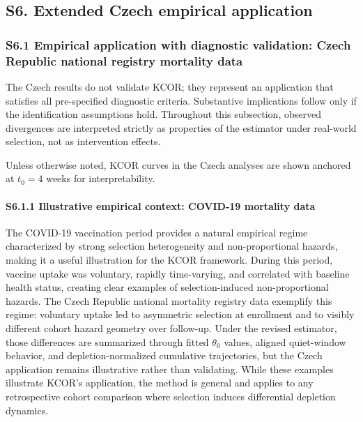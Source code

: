 \documentclass[
]{article}
\begin{document}
\subsection{S6. Extended Czech empirical
application}\label{s6.-extended-czech-empirical-application}

\subsubsection{S6.1 Empirical application with diagnostic validation:
Czech Republic national registry mortality
data}\label{s6.1-empirical-application-with-diagnostic-validation-czech-republic-national-registry-mortality-data}

The Czech results do not validate KCOR; they represent an application
that satisfies all pre-specified diagnostic criteria. Substantive
implications follow only if the identification assumptions hold.
Throughout this subsection, observed divergences are interpreted
strictly as properties of the estimator under real-world selection, not
as intervention effects.

Unless otherwise noted, KCOR curves in the Czech analyses are shown
anchored at \(t_0 = 4\) weeks for interpretability.

\paragraph{S6.1.1 Illustrative empirical context: COVID-19 mortality
data}\label{s6.1.1-illustrative-empirical-context-covid-19-mortality-data}

The COVID-19 vaccination period provides a natural empirical regime
characterized by strong selection heterogeneity and non-proportional
hazards, making it a useful illustration for the KCOR framework. During
this period, vaccine uptake was voluntary, rapidly time-varying, and
correlated with baseline health status, creating clear examples of
selection-induced non-proportional hazards. The Czech Republic national
mortality registry data exemplify this regime: voluntary uptake led to
asymmetric selection at enrollment and to visibly different cohort
hazard geometry over follow-up. Under the revised estimator, those
differences are summarized through fitted \(\theta_0\) values, aligned
quiet-window behavior, and depletion-normalized cumulative trajectories,
but the Czech application remains illustrative rather than validating.
While these examples illustrate KCOR's application, the method is
general and applies to any retrospective cohort comparison where
selection induces differential depletion dynamics.
\end{document}
